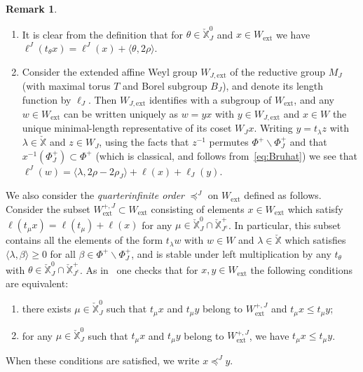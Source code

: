 \documentclass[11pt]{amsart}
\numberwithin{equation}{section}
\theoremstyle{plain}
\theoremstyle{definition}
\newtheorem{rmk}[thm]{Remark}
\newcommand{\X}{{\mathbb X}}
\newcommand{\Xd}{\check{\X}}
\newcommand{\Phis}{\Phi^{\mathrm{s}}}
\newcommand{\ex}{\mathrm{ext}}
\newcommand{\comp}{\mathrm{c}}
\begin{document}
\begin{rmk}
\label{rmk:lJ}
\begin{enumerate}
\item
\label{it:lJ-translation}
It is clear from the definition that for $\theta \in \Xd_J^0$ and $x \in W_\ex$ we have $\ell^J(t_\theta x) = \ell^J(x) + \langle \theta, 2\rho \rangle$.
\item
\label{it:lJ-WJext}
Consider the extended affine Weyl group $W_{J,\ex}$ of the reductive group $M_J$ (with maximal torus $T$ and Borel subgroup $B_J$), and denote its length function by $\ell_J$. Then $W_{J,\ex}$ identifies with a subgroup of $W_\ex$, and any $w \in W_\ex$ can be written uniquely as $w=yx$ with $y \in W_{J,\ex}$ and $x \in W$ the unique minimal-length representative of its coset $W_J x$. Writing $y=t_\lambda z$ with $\lambda \in \Xd$ and $z \in W_J$, using the facts that $z^{-1}$ permutes $\Phi^+ \smallsetminus \Phi_J^+$ and that $x^{-1}(\Phi_J^+) \subset \Phi^+$ (which is classical, and follows from~\eqref{eq:Bruhat}) we see that $\ell^J(w) = \langle \lambda, 2\rho-2\rho_J \rangle + \ell(x) + \ell_J(y)$.
\end{enumerate}
\end{rmk}

We also consider the \emph{quarterinfinite order} $\preceq^J$ on $W_\ex$ defined as follows. Consider the subset $W_\ex^{+,J} \subset W_\ex$ consisting of elements $x \in W_\ex$ which satisfy $\ell(t_\mu x)=\ell(t_\mu) + \ell(x)$ for any $\mu \in \Xd_J^0 \cap \Xd^+_{J^\comp}$. In particular, this subset contains all the elements of the form $t_\lambda w$ with $w \in W$ and $\lambda \in \Xd$ which satisfies $\langle \lambda, \beta \rangle \geq 0$ for all $\beta \in \Phi^+ \smallsetminus \Phi_J^+$, and is stable under left multiplication by any $t_\theta$ with $\theta \in \Xd_J^0 \cap \Xd^+_{J^\comp}$. As in~\cite[\S 3.1]{adr} one checks that for $x,y \in W_\ex$ the following conditions are equivalent:
\begin{enumerate}
\item
there exists $\mu \in \Xd^0_J$ such that $t_\mu x$ and $t_\mu y$ belong to $W_\ex^{+,J}$ and $t_\mu x \leq t_\mu y$;
\item
for any $\mu \in \Xd^0_J$ such that $t_\mu x$ and $t_\mu y$ belong to $W_\ex^{+,J}$, we have $t_\mu x \leq t_\mu y$.
\end{enumerate}
When these conditions are satisfied, we write $x \preceq^J y$.
\end{document}
